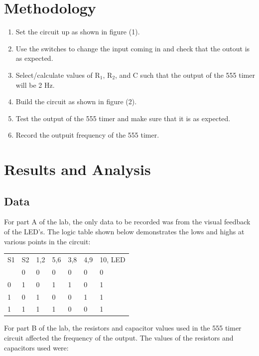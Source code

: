 \documentclass[twocolumn, amsmath]{revtex4}
\begin{document}
\section{Methodology}

\begin{enumerate}
    \item Set the circuit up as shown in figure (1). 
    \item Use the switches to change the input coming in and check that the outout is as expected.
    \item Select/calculate values of R$_1$, R$_2$, and C such that the output of the 555 timer will be 2 Hz.
    \item Build the circuit as shown in figure (2).
    \item Test the output of the 555 timer and make sure that it is as expected.
    \item Record the outpuit frequency of the 555 timer.
\end{enumerate}


\section{Results and Analysis}

\subsection{Data}
For part A of the lab, the only data to be recorded was from the visual feedback of the LED's. The logic table shown below demonstrates the lows and highs at various points in the circuit:

\begin{center}
	\begin{ruledtabular}
    \begin{tabular}{ l l l l l l l}
	S1 & S2 & 1,2 & 5,6 & 3,8 & 4,9 & 10, LED \\ \colrule
	0 & 0 & 0 & 0 & 0 & 0 & 0  \\
	0 & 1 & 0 & 1 & 1 & 0 & 1 \\
	1 & 0 & 1 & 0 & 0 & 1 & 1  \\
	1 & 1 & 1 & 1 & 0 & 0 & 1 \\
\end{tabular}
    \end{ruledtabular}
\end{center}

For part B of the lab, the resistors and capacitor values used in the 555 timer circuit affected the frequency of the output. The values of the resistors and capacitors used were:
\end{document}
